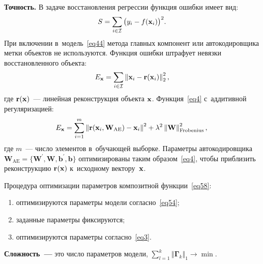 \begin{multicols}{2}
\textbf{Точность.} В задаче восстановления регрессии функция ошибки имеет вид:
\begin{equation}
\label{eq3}
S = \sum_{i\in\mathcal{I}}\big(y_i-f({\mathbf{x}}_i)\big)^2.
\end{equation}
При включении в~модель~\eqref{eq44} метода главных компонент или 
автокодировщика метки объектов не используются. Функция ошибки штрафует 
невязки восстановленного объекта:
\begin{equation}
\label{eq4}
E_\mathbf{x} = \sum\limits_{i\in\mathcal{I}}\left\Vert{{\mathbf{x}}_i-
\mathbf{r}({\mathbf{x}}_i)}\right\Vert_2^2,
\end{equation}
где $\mathbf{r}({\mathbf{x}})$~--- линейная реконструкция объекта ${\mathbf{x}}$. 
Функция~\eqref{eq4} с~аддитивной регуляризацией:
\begin{equation}
\!\!\!E_\mathbf{x} = 
\sum\limits_{i=1}^m\left\Vert\mathbf{r}(\mathbf{x}_i,\mathbf{W}_{\mathrm{AE}}
) - {\mathbf{x}}_i\right\Vert^2 + 
\lambda^2\left\Vert\mathbf{W}\right\Vert_{\mathrm{Frobenius}}^2,\!\!
\label{eq54}
\end{equation}
где $m$~--- число элементов в~обучающей выборке.
Параметры автокодировщика $\mathbf{W}_{\mathrm{AE}} = 
\{\mathbf{W}^{'},\mathbf{W},\mathbf{b}^{'},\mathbf{b}\}$ оптимизированы таким 
образом~\eqref{eq4}, чтобы приблизить реконструкцию $\mathbf{r}({\mathbf{x}})$ 
к~исходному вектору~${\mathbf{x}}$.

Процедура оптимизации параметров композитной функции~\eqref{eq58}: 
\begin{enumerate}[(1)]
\item оптимизируются параметры модели согласно~\eqref{eq54}; 
\item заданные 
параметры фиксируются; 
\item оптимизируются параметры согласно~\eqref{eq3}.
\end{enumerate}

\textbf{Сложность~---} это число параметров модели, $\sum\nolimits_{l = 1}^k
\left\Vert\boldsymbol{\Gamma}_k\right\Vert_1 \rightarrow \min.$


\end{multicols}
